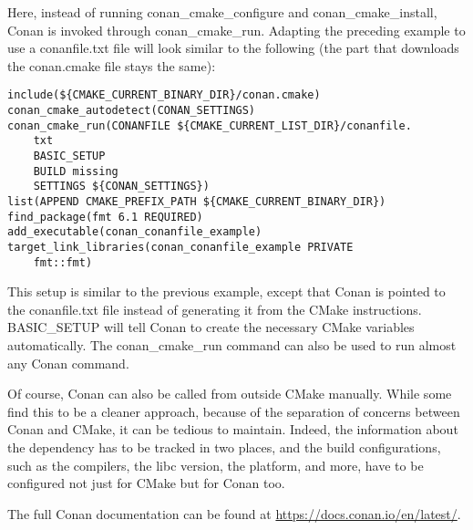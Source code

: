Here, instead of running conan\_cmake\_configure and conan\_cmake\_install, Conan is invoked through conan\_cmake\_run. Adapting the preceding example to use a conanfile.txt file will look similar to the following (the part that downloads the conan.cmake file stays the same):

\begin{lstlisting}[style=styleCMake]
include(${CMAKE_CURRENT_BINARY_DIR}/conan.cmake)
conan_cmake_autodetect(CONAN_SETTINGS)
conan_cmake_run(CONANFILE ${CMAKE_CURRENT_LIST_DIR}/conanfile.
	txt
	BASIC_SETUP
	BUILD missing
	SETTINGS ${CONAN_SETTINGS})
list(APPEND CMAKE_PREFIX_PATH ${CMAKE_CURRENT_BINARY_DIR})
find_package(fmt 6.1 REQUIRED)
add_executable(conan_conanfile_example)
target_link_libraries(conan_conanfile_example PRIVATE
	fmt::fmt)
\end{lstlisting}

This setup is similar to the previous example, except that Conan is pointed to the conanfile.txt file instead of generating it from the CMake instructions. BASIC\_SETUP will tell Conan to create the necessary CMake variables automatically. The conan\_cmake\_run command can also be used to run almost any Conan command.

Of course, Conan can also be called from outside CMake manually. While some find this to be a cleaner approach, because of the separation of concerns between Conan and CMake, it can be tedious to maintain. Indeed, the information about the dependency has to be tracked in two places, and the build configurations, such as the compilers, the libc version, the platform, and more, have to be configured not just for CMake but for Conan too.

The full Conan documentation can be found at \url{https://docs.conan.io/en/latest/}.























